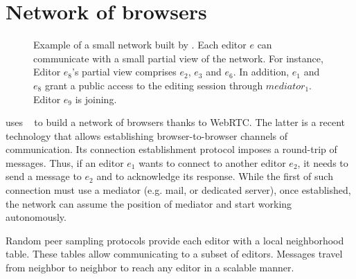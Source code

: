
\section{Network of browsers}
\label{sec:network}

\begin{figure}
  \centering
  
  \caption{Example of a small network built by \SPRAY. Each editor $e$ can
    communicate with a small partial view of the network. For instance, Editor
    $e_8$'s partial view comprises $e_2$, $e_3$ and $e_6$. In addition, $e_1$
    and $e_8$ grant a public access to the editing session through
    $mediator_1$. Editor $e_9$ is joining.}
  \label{fig:spray}
\end{figure}


\CRATE uses \SPRAY~\cite{nedelec2015spray} to build a network of browsers thanks
to WebRTC. The latter is a recent technology that allows establishing
browser-to-browser channels of communication. Its connection establishment
protocol imposes a round-trip of messages. Thus, if an editor $e_1$ wants to
connect to another editor $e_2$, it needs to send a message to $e_2$ and to
acknowledge its response. While the first of such connection must use a mediator
(e.g. mail, or dedicated server), once established, the network can assume the
position of mediator and start working autonomously.

Random peer sampling protocols provide each editor with a local neighborhood
table. These tables allow communicating to a subset of editors. Messages travel
from neighbor to neighbor to reach any editor in a scalable manner.




